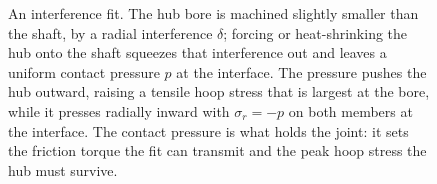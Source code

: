 \begin{figure}[htbp]
\caption[Interference (shrink) fit of a hub on a shaft]{An interference
fit. The hub bore is machined slightly smaller than the shaft, by a
radial interference $\delta$; forcing or heat-shrinking the hub onto the
shaft squeezes that interference out and leaves a uniform contact
pressure $p$ at the interface. The pressure pushes the hub outward,
raising a tensile hoop stress that is largest at the bore, while it
presses radially inward with $\sigma_r = -p$ on both members at the
interface. The contact pressure is what holds the joint: it sets the
friction torque the fit can transmit and the peak hoop stress the hub
must survive.}
\label{fig:vol03ch03:shrink-fit-pressure}
\end{figure}
